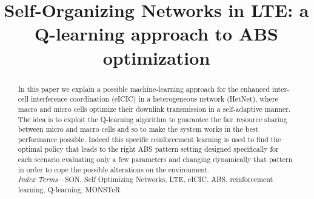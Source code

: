 \documentclass[conference,10pt]{IEEEtran}
\begin{document}
\title{Self-Organizing Networks	in LTE: a Q-learning approach to ABS optimization}

\author{
}

\maketitle

\begin{abstract}
In this paper we explain a possible machine-learning approach for the enhanced inter-cell interference coordination (eICIC) in a heterogeneous network (HetNet), where macro and micro cells optimize their downlink transmission in a self-adaptive manner. The idea is to exploit the Q-learning algorithm to guarantee the fair resource sharing between micro and macro cells and so to make the system works in the best performance possible. Indeed this specific reinforcement learning is used to find the optimal policy that leads to the right ABS pattern setting designed specifically for each scenario evaluating only a few parameters and changing dynamically that pattern in order to cope the possible alterations on the environment.\\

\textit{Index  Terms}---SON, Self Optimizing Networks, LTE, eICIC, ABS, reinforcement learning, Q-learning, MONSTeR     
\end{abstract}

\end{document}
